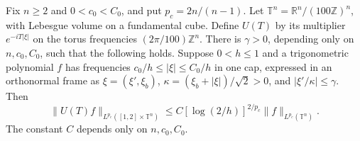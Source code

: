 Fix \(n\ge2\) and \(0<c_0<C_0\), and put \(p_c=2n/(n-1)\).
Let \(\mathbb T^n=\mathbb R^n/(100\mathbb Z)^n\), with Lebesgue
volume on a fundamental cube. Define \(U(T)\) by its multiplier
\(e^{-iT|\xi|}\) on the torus frequencies \((2\pi/100)\mathbb Z^n\).
There is \(\gamma>0\), depending only on \(n,c_0,C_0\), such that
the following holds. Suppose \(0<h\le1\) and a trigonometric
polynomial \(f\) has frequencies \(c_0/h\le|\xi|\le C_0/h\) in
one cap, expressed in an orthonormal frame as
\(\xi=(\xi',\xi_b)\), \(\kappa=(\xi_b+|\xi|)/\sqrt 2>0\), and
\(|\xi'/\kappa|\le\gamma\). Then
\[
 \|U(T)f\|_{L^{p_c}([1,2]\times\mathbb T^n)}
 \le C[\log(2/h)]^{2/p_c}\|f\|_{L^{p_c}(\mathbb T^n)}.
\]
The constant \(C\) depends only on \(n,c_0,C_0\).
